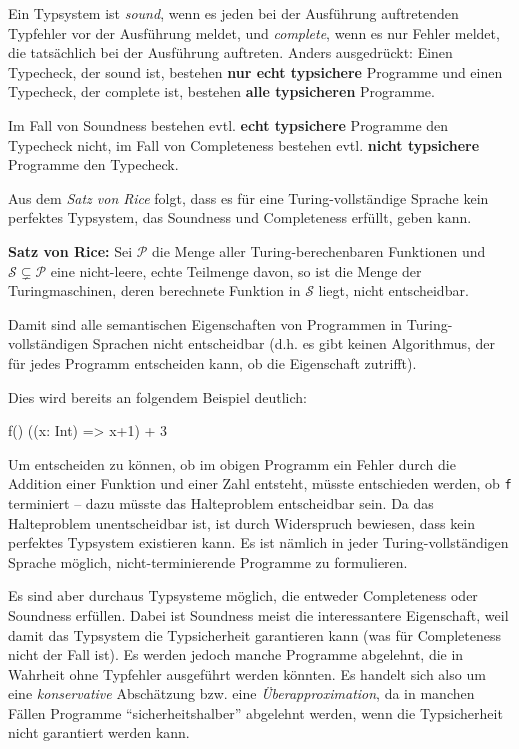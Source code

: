 \documentclass[]{article}
\newenvironment{Shaded}{}{}
\newcommand{\DecValTok}[1]{\textcolor[rgb]{0.25,0.63,0.44}{#1}}
\newcommand{\FunctionTok}[1]{\textcolor[rgb]{0.02,0.16,0.49}{#1}}
\newcommand{\NormalTok}[1]{#1}
\begin{document}
Ein Typsystem ist \emph{sound}, wenn es jeden bei der Ausführung
auftretenden Typfehler vor der Ausführung meldet, und \emph{complete},
wenn es nur Fehler meldet, die tatsächlich bei der Ausführung auftreten.
Anders ausgedrückt: Einen Typecheck, der sound ist, bestehen \textbf{nur
echt typsichere} Programme und einen Typecheck, der complete ist,
bestehen \textbf{alle typsicheren} Programme.

Im Fall von Soundness bestehen evtl. \textbf{echt typsichere} Programme
den Typecheck nicht, im Fall von Completeness bestehen evtl.
\textbf{nicht typsichere} Programme den Typecheck.

Aus dem \emph{Satz von Rice} folgt, dass es für eine Turing-vollständige
Sprache kein perfektes Typsystem, das Soundness und Completeness
erfüllt, geben kann.

\textbf{Satz von Rice:} Sei \(\mathcal{P}\) die Menge aller
Turing-berechenbaren Funktionen und
\(\mathcal{S} \subsetneq \mathcal{P}\) eine nicht-leere, echte Teilmenge
davon, so ist die Menge der Turingmaschinen, deren berechnete Funktion
in \(\mathcal{S}\) liegt, nicht entscheidbar.

Damit sind alle semantischen Eigenschaften von Programmen in
Turing-vollständigen Sprachen nicht entscheidbar (d.h. es gibt keinen
Algorithmus, der für jedes Programm entscheiden kann, ob die Eigenschaft
zutrifft).

Dies wird bereits an folgendem Beispiel deutlich:

\begin{Shaded}
\begin{Highlighting}[]
\FunctionTok{f}\NormalTok{()}
\NormalTok{((x: Int) =\textgreater{} x+}\DecValTok{1}\NormalTok{) + }\DecValTok{3}
\end{Highlighting}
\end{Shaded}

Um entscheiden zu können, ob im obigen Programm ein Fehler durch die
Addition einer Funktion und einer Zahl entsteht, müsste entschieden
werden, ob \texttt{f} terminiert -- dazu müsste das Halteproblem
entscheidbar sein. Da das Halteproblem unentscheidbar ist, ist durch
Widerspruch bewiesen, dass kein perfektes Typsystem existieren kann. Es
ist nämlich in jeder Turing-vollständigen Sprache möglich,
nicht-terminierende Programme zu formulieren.

Es sind aber durchaus Typsysteme möglich, die entweder Completeness oder
Soundness erfüllen. Dabei ist Soundness meist die interessantere
Eigenschaft, weil damit das Typsystem die Typsicherheit garantieren kann
(was für Completeness nicht der Fall ist). Es werden jedoch manche
Programme abgelehnt, die in Wahrheit ohne Typfehler ausgeführt werden
könnten. Es handelt sich also um eine \emph{konservative} Abschätzung
bzw. eine \emph{Überapproximation}, da in manchen Fällen Programme
``sicherheitshalber'' abgelehnt werden, wenn die Typsicherheit nicht
garantiert werden kann.
\end{document}
